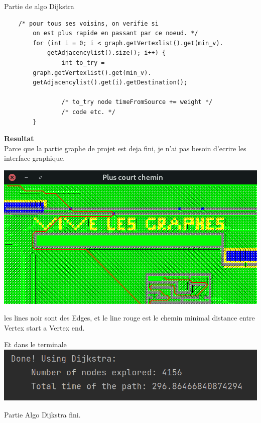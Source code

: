 \documentclass[12pt]{fphw}
\begin{document}
Partie de algo Dijkstra
\begin{lstlisting}
	/* pour tous ses voisins, on verifie si 
		on est plus rapide en passant par ce noeud. */
        for (int i = 0; i < graph.getVertexlist().get(min_v).
			getAdjacencylist().size(); i++) {
        		int to_try = 
		graph.getVertexlist().get(min_v).
		getAdjacencylist().get(i).getDestination();

                /* to_try node timeFromSource += weight */
                /* code etc. */
        }
\end{lstlisting}

\newpage
\textbf{Resultat}\\
Parce que la partie graphe de projet est deja fini, je n'ai pas besoin d'ecrire les interface graphique.\\
\begin{center}
	\includegraphics[width=1\columnwidth]{TP7B_dijkstra.png}
\end{center}
les lines noir sont des Edges, et le line rouge est le chemin minimal distance entre Vertex start a Vertex end.

\begin{center}
	Et dans le terminale
	\includegraphics[width=1\columnwidth]{TD7B_dijkstra_res.png}
\end{center}

Partie Algo Dijkstra fini.
\end{document}
